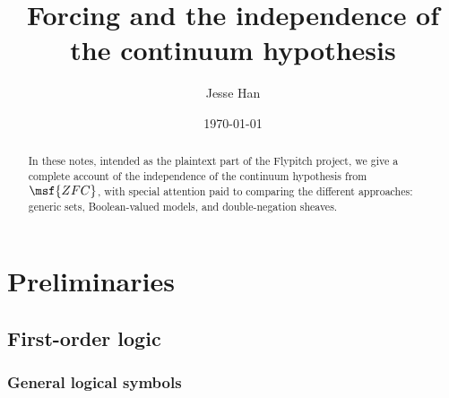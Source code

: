 \documentclass[11pt]{article}
\begin{document}
\title{Forcing and the independence of the continuum hypothesis}
\author{Jesse Han}
\date{\today}

\maketitle


\begin{abstract}
In these notes, intended as the plaintext part of the Flypitch project, we give a complete account of the independence of the continuum hypothesis from $\msf{ZFC}$, with special attention paid to comparing the different approaches: generic sets, Boolean-valued models, and double-negation sheaves.
\end{abstract}

\tableofcontents


\newpage \section{Preliminaries}

\subsection{First-order logic}
\subsubsection{General logical symbols}
\end{document}
